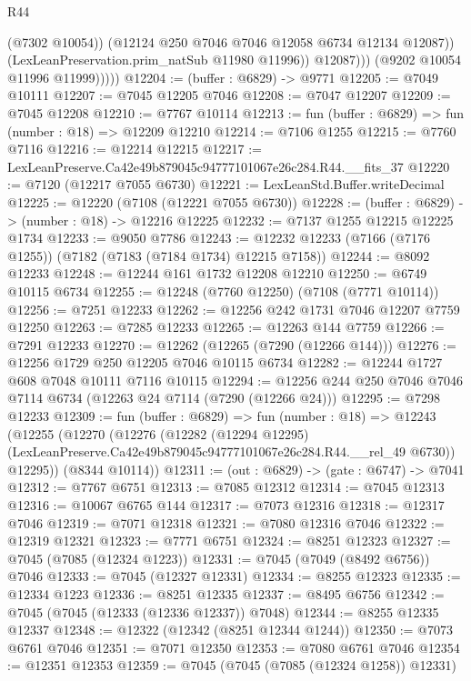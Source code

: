 \begin{lexlean}{R44}
\begin{coremodule}
{                        (@7302 @10054))
                      (@12124 @250 @7046 @7046 @12058 @6734 @12134 @12087))
                    (LexLeanPreservation.prim_natSub @11980 @11996))
                  @12087)))
            (@9202 @10054 @11996 @11999)))))
@12204 := (buffer : @6829) -> @9771
@12205 := @7049 @10111
@12207 := @7045 @12205 @7046
@12208 := @7047 @12207
@12209 := @7045 @12208
@12210 := @7767 @10114
@12213 := fun (buffer : @6829) => fun (number : @18) => @12209 @12210
@12214 := @7106 @1255
@12215 := @7760 @7116
@12216 := @12214 @12215
@12217 := LexLeanPreserve.Ca42e49b879045c94777101067e26c284.R44.__fits_37
@12220 := @7120 (@12217 @7055 @6730)
@12221 := LexLeanStd.Buffer.writeDecimal
@12225 := @12220 (@7108 (@12221 @7055 @6730))
@12228 := (buffer : @6829) -> (number : @18) -> @12216 @12225
@12232 := @7137 @1255 @12215 @12225 @1734
@12233 := @9050 @7786
@12243 := @12232 @12233 (@7166 (@7176 @1255)) (@7182 (@7183 (@7184 @1734) @12215 @7158))
@12244 := @8092 @12233
@12248 := @12244 @161 @1732 @12208 @12210
@12250 := @6749 @10115 @6734
@12255 := @12248 (@7760 @12250) (@7108 (@7771 @10114))
@12256 := @7251 @12233
@12262 := @12256 @242 @1731 @7046 @12207 @7759 @12250
@12263 := @7285 @12233
@12265 := @12263 @144 @7759
@12266 := @7291 @12233
@12270 := @12262 (@12265 (@7290 (@12266 @144)))
@12276 := @12256 @1729 @250 @12205 @7046 @10115 @6734
@12282 := @12244 @1727 @608 @7048 @10111 @7116 @10115
@12294 := @12256 @244 @250 @7046 @7046 @7114 @6734 (@12263 @24 @7114 (@7290 (@12266 @24)))
@12295 := @7298 @12233
@12309 := fun (buffer : @6829) =>
  fun (number : @18) =>
  @12243
    (@12255
      (@12270
        (@12276
          (@12282
            (@12294 @12295)
            (LexLeanPreserve.Ca42e49b879045c94777101067e26c284.R44.__rel_49 @6730))
          @12295))
      (@8344 @10114))
@12311 := (out : @6829) -> (gate : @6747) -> @7041
@12312 := @7767 @6751
@12313 := @7085 @12312
@12314 := @7045 @12313
@12316 := @10067 @6765 @144
@12317 := @7073 @12316
@12318 := @12317 @7046
@12319 := @7071 @12318
@12321 := @7080 @12316 @7046
@12322 := @12319 @12321
@12323 := @7771 @6751
@12324 := @8251 @12323
@12327 := @7045 (@7085 (@12324 @1223))
@12331 := @7045 (@7049 (@8492 @6756)) @7046
@12333 := @7045 (@12327 @12331)
@12334 := @8255 @12323
@12335 := @12334 @1223
@12336 := @8251 @12335
@12337 := @8495 @6756
@12342 := @7045 (@7045 (@12333 (@12336 @12337)) @7048)
@12344 := @8255 @12335 @12337
@12348 := @12322 (@12342 (@8251 @12344 @1244))
@12350 := @7073 @6761 @7046
@12351 := @7071 @12350
@12353 := @7080 @6761 @7046
@12354 := @12351 @12353
@12359 := @7045 (@7045 (@7085 (@12324 @1258)) @12331)
}
\end{coremodule}
\end{lexlean}
